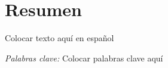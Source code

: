 \chapter*{Resumen}

Colocar texto aquí en español
\vspace{5mm}

\textit{Palabras clave:} Colocar palabras clave aquí
